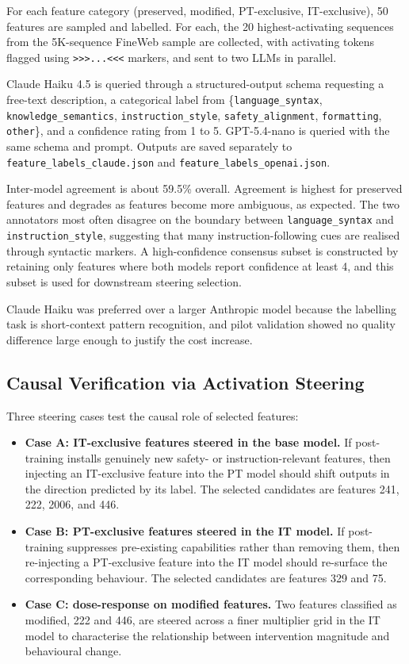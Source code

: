 For each feature category (preserved, modified, PT-exclusive, IT-exclusive), 50 features are sampled and labelled. For each, the 20 highest-activating sequences from the 5K-sequence FineWeb sample are collected, with activating tokens flagged using \texttt{>>>...<<<} markers, and sent to two LLMs in parallel.

Claude Haiku 4.5 is queried through a structured-output schema requesting a free-text description, a categorical label from \{\texttt{language\_syntax}, \texttt{knowledge\_semantics}, \texttt{instruction\_style}, \texttt{safety\_alignment}, \texttt{formatting}, \texttt{other}\}, and a confidence rating from 1 to 5. GPT-5.4-nano is queried with the same schema and prompt. Outputs are saved separately to \texttt{feature\_labels\_claude.json} and \texttt{feature\_labels\_openai.json}.

Inter-model agreement is about 59.5\% overall. Agreement is highest for preserved features and degrades as features become more ambiguous, as expected. The two annotators most often disagree on the boundary between \texttt{language\_syntax} and \texttt{instruction\_style}, suggesting that many instruction-following cues are realised through syntactic markers. A high-confidence consensus subset is constructed by retaining only features where both models report confidence at least 4, and this subset is used for downstream steering selection.

Claude Haiku was preferred over a larger Anthropic model because the labelling task is short-context pattern recognition, and pilot validation showed no quality difference large enough to justify the cost increase.

\subsection{Causal Verification via Activation Steering}
\label{subsec:causal-verification}

Three steering cases test the causal role of selected features:
\begin{itemize}
    \item \textbf{Case A: IT-exclusive features steered in the base model.} If post-training installs genuinely new safety- or instruction-relevant features, then injecting an IT-exclusive feature into the PT model should shift outputs in the direction predicted by its label. The selected candidates are features 241, 222, 2006, and 446.
    \item \textbf{Case B: PT-exclusive features steered in the IT model.} If post-training suppresses pre-existing capabilities rather than removing them, then re-injecting a PT-exclusive feature into the IT model should re-surface the corresponding behaviour. The selected candidates are features 329 and 75.
    \item \textbf{Case C: dose-response on modified features.} Two features classified as modified, 222 and 446, are steered across a finer multiplier grid in the IT model to characterise the relationship between intervention magnitude and behavioural change.
\end{itemize}

